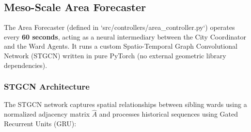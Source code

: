 \documentclass[conference]{IEEEtran}
\begin{document}
\subsection{Meso-Scale Area Forecaster}
The Area Forecaster (defined in `src/controllers/area_controller.py`) operates every \textbf{60 seconds}, acting as a neural intermediary between the City Coordinator and the Ward Agents. It runs a custom Spatio-Temporal Graph Convolutional Network (STGCN) written in pure PyTorch (no external geometric library dependencies).

\subsubsection{STGCN Architecture}
The STGCN network captures spatial relationships between sibling wards using a normalized adjacency matrix $\hat{A}$ and processes historical sequences using Gated Recurrent Units (GRU):
\end{document}
